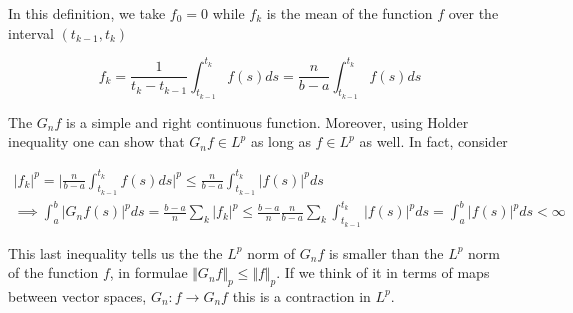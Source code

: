 In this definition, we take $f_0 = 0$ while $f_k$ is the mean of the function $f$ over the interval $(t_{k-1},t_k)$ 

\begin{equation*}
    f_k = \frac{1}{t_k-t_{k-1}} \int_{t_{k-1}}^{t_k} f(s) ds = \frac{n}{b-a} \int_{t_{k-1}}^{t_k} f(s) ds
\end{equation*}

The $G_n f$ is a simple and right continuous function. Moreover, using Holder inequality one can show that $G_n f \in L^p$ as long as $f \in L^p$ as well. In fact, consider

\begin{gather*}
    \vert f_k \vert^p = \Bigg\vert \frac{n}{b-a} \int_{t_{k-1}}^{t_k} f(s) ds \Bigg\vert^p \leq \frac{n}{b-a} \int_{t_{k-1}}^{t_k} \vert f(s) \vert^p ds \\
    \implies \int_a^b \vert G_n f(s) \vert^p ds = \frac{b-a}{n} \sum_{k} \vert f_k \vert^p \leq \frac{b-a}{n} \frac{n}{b-a} \sum_k \int_{t_{k-1}}^{t_k} \vert f(s) \vert^p ds = \int_a^b \vert f(s) \vert^p ds < \infty
\end{gather*}

This last inequality tells us the the $L^p$ norm of $G_n f$ is smaller than the $L^p$ norm of the function $f$, in formulae $\Vert G_n f \Vert_p \leq \Vert f \Vert_p$. If we think of it in terms of maps between vector spaces, $G_n : f \to G_n f$ this is a contraction in $L^p$. 

